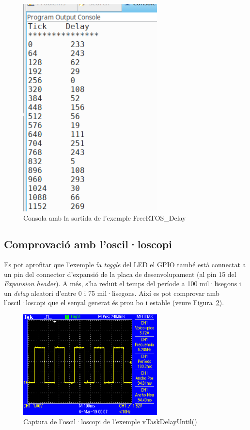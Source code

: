 \begin{figure}
 \centering
 \includegraphics[width=0.65\textwidth, keepaspectratio]{imatges/TaskDelayUntilConsole.png}
 \caption{Consola amb la sortida de l'exemple FreeRTOS\_Delay}
 \label{fig:TaskDelayConsole}
\end{figure}

\subsection{Comprovació amb l'oscil·loscopi}
Es pot aprofitar que l'exemple fa {\em toggle} del LED el GPIO també està connectat a un pin del connector d'expansió de la placa de desenvolupament (al pin 15 del {\em Expansion header}).
A més, s'ha reduït el temps del període a 100 mil·lisegons i un {\em delay} aleatori d'entre 0 i 75 mil·lisegons. Així es pot comprovar amb l'oscil·loscopi que el senyal generat és prou bo i estable (veure Figura~\ref{fig:DelayUntil}).

\begin{figure}
 \centering
 \includegraphics[width=0.65\textwidth, keepaspectratio]{imatges/DelayUntil.png}
 \caption{Captura de l'oscil·loscopi de l'exemple vTaskDelayUntil()}
 \label{fig:DelayUntil}
\end{figure}

